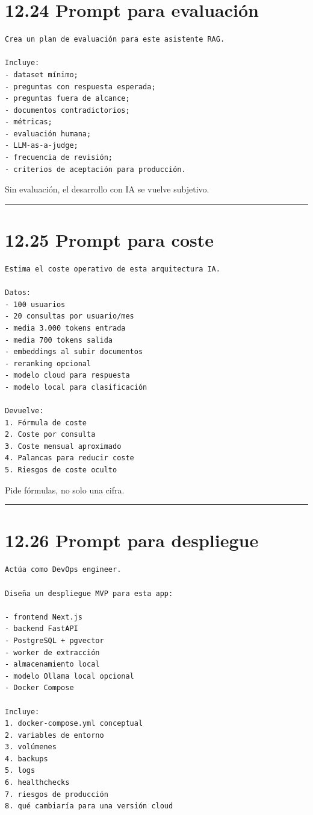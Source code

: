 \section{12.24 Prompt para evaluación}\label{prompt-para-evaluaciuxf3n}

\begin{lstlisting}
Crea un plan de evaluación para este asistente RAG.

Incluye:
- dataset mínimo;
- preguntas con respuesta esperada;
- preguntas fuera de alcance;
- documentos contradictorios;
- métricas;
- evaluación humana;
- LLM-as-a-judge;
- frecuencia de revisión;
- criterios de aceptación para producción.
\end{lstlisting}

Sin evaluación, el desarrollo con IA se vuelve subjetivo.

\begin{center}\rule{0.5\linewidth}{0.5pt}\end{center}

\section{12.25 Prompt para coste}\label{prompt-para-coste}

\begin{lstlisting}
Estima el coste operativo de esta arquitectura IA.

Datos:
- 100 usuarios
- 20 consultas por usuario/mes
- media 3.000 tokens entrada
- media 700 tokens salida
- embeddings al subir documentos
- reranking opcional
- modelo cloud para respuesta
- modelo local para clasificación

Devuelve:
1. Fórmula de coste
2. Coste por consulta
3. Coste mensual aproximado
4. Palancas para reducir coste
5. Riesgos de coste oculto
\end{lstlisting}

Pide fórmulas, no solo una cifra.

\begin{center}\rule{0.5\linewidth}{0.5pt}\end{center}

\section{12.26 Prompt para despliegue}\label{prompt-para-despliegue}

\begin{lstlisting}
Actúa como DevOps engineer.

Diseña un despliegue MVP para esta app:

- frontend Next.js
- backend FastAPI
- PostgreSQL + pgvector
- worker de extracción
- almacenamiento local
- modelo Ollama local opcional
- Docker Compose

Incluye:
1. docker-compose.yml conceptual
2. variables de entorno
3. volúmenes
4. backups
5. logs
6. healthchecks
7. riesgos de producción
8. qué cambiaría para una versión cloud
\end{lstlisting}

